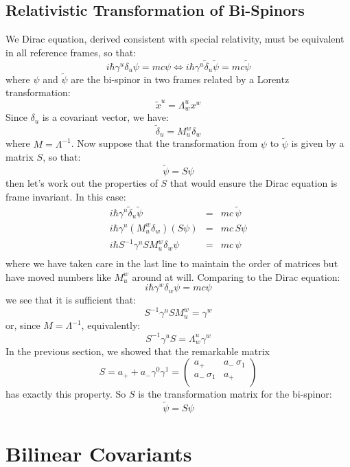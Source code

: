 \documentclass[12pt]{book}
\begin{document}
\subsection{Relativistic Transformation of Bi-Spinors}
We Dirac equation, derived consistent with special relativity, must be equivalent in all reference frames, so that:
$$i\hbar \gamma^u \delta_u \psi = mc \psi \Leftrightarrow 
i\hbar \gamma^u \widetilde{\delta}_u \widetilde{\psi} = mc \widetilde{\psi}$$
where $\psi$ and $\widetilde{\psi}$ are the bi-spinor in two frames related by a Lorentz transformation:
$$\widetilde{x}^u = \Lambda^u_w x^w$$
Since $\delta_u$ is a covariant vector, we have:
$$\widetilde{\delta}_u = M^w_u \delta_w$$
where $M = \Lambda^{-1}$.  Now suppose that the transformation from $\psi$ to $\widetilde{\psi}$ is given by a matrix $S$, so that:
$$\widetilde{\psi} = S \psi$$
then let's work out the properties of $S$ that would ensure the Dirac equation is frame invariant.  In this case:
\begin{eqnarray*}
i\hbar \gamma^u \widetilde{\delta}_u \widetilde{\psi} &=& mc \, \widetilde{\psi} \\[3pt]
i\hbar \gamma^u (M^w_u \delta_w) (S \psi) &=& mc \, S \psi \\[3pt]
i\hbar S^{-1} \gamma^u S M^w_u \delta_w \psi &=& mc \, \psi \\
\end{eqnarray*}
where we have taken care in the last line to maintain the order of matrices but have moved numbers like $M^w_u$ around at will.  Comparing to the Dirac equation:
$$i\hbar \gamma^w \delta_w \psi = mc \psi$$
we see that it is sufficient that:
$$S^{-1} \gamma^u S M^w_u = \gamma^w$$
or, since $M = \Lambda^{-1}$, equivalently:
$$S^{-1} \gamma^u S = \Lambda_w^u \gamma^w$$
In the previous section, we showed that the remarkable matrix 
$$S = a_+ + a_- \gamma^0 \gamma^1 = \begin{pmatrix} 
a_+ & a_- \, \sigma_1 \\ 
a_- \, \sigma_1 & a_+ \\
\end{pmatrix}
$$
has exactly this property.  So $S$ is the transformation matrix for the bi-spinor:
$$\widetilde{\psi} = S \psi$$

\section{Bilinear Covariants}
\end{document}
